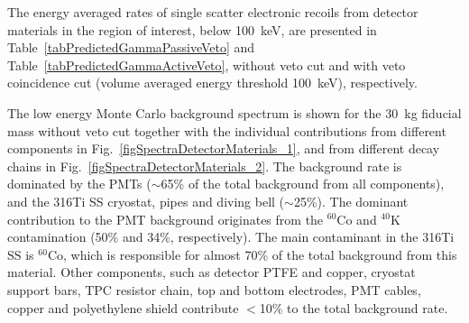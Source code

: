 The energy averaged rates of single scatter electronic recoils from detector materials in the region of interest, below 100~keV, are presented in Table~\ref{tabPredictedGammaPassiveVeto} and Table~\ref{tabPredictedGammaActiveVeto}, without veto cut and with veto coincidence cut (volume averaged energy threshold 100~keV), respectively. 

The low energy Monte Carlo background spectrum is shown for the 30~kg fiducial mass without veto cut together with the individual contributions from different components in Fig.~\ref{figSpectraDetectorMaterials_1}, and from different decay chains in Fig.~\ref{figSpectraDetectorMaterials_2}. The background rate is dominated by the PMTs ($\sim$65\% of the total background from all components), and the 316Ti SS cryostat, pipes and diving bell ($\sim$25\%). The dominant contribution to the PMT background originates from the $^{60}$Co and $^{40}$K contamination (50\% and 34\%, respectively). The main contaminant in the 316Ti SS is  $^{60}$Co, which is responsible for almost 70\% of the total background from this material. Other components, such as detector PTFE and copper, cryostat support bars, TPC resistor chain, top and bottom electrodes, PMT cables, copper and polyethylene shield contribute $<$10\% to the total background rate.

